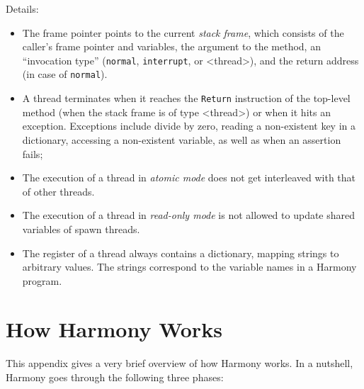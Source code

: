 \documentclass{report}
\begin{document}
Details:
\begin{itemize}
\item The frame pointer points to the current \emph{stack frame},
which consists of the caller's frame pointer and variables, the argument to
the method, an ``invocation type'' (\texttt{normal}, \texttt{interrupt}, or
<{thread}>), and the return address (in case of \texttt{normal}).
\item A thread terminates when it reaches the \texttt{Return} instruction
of the top-level method (when the stack frame is of type <{thread}>)
or when it hits an exception.  Exceptions include divide by zero,
reading a non-existent key in a dictionary, accessing a non-existent
variable, as well as when an assertion fails;
\item The execution of a thread in \emph{atomic mode} does not get interleaved
with that of other threads.
\item The execution of a thread in \emph{read-only mode} is not allowed
to update shared variables of spawn threads.
\item The register of a thread always contains a dictionary, mapping
strings to arbitrary values.  The strings correspond to the variable names
in a Harmony program.
\end{itemize}

\chapter{How Harmony Works}\label{app:howitworks}

This appendix gives a very brief overview of how Harmony works.
In a nutshell, Harmony goes through the following three phases:
\end{document}
